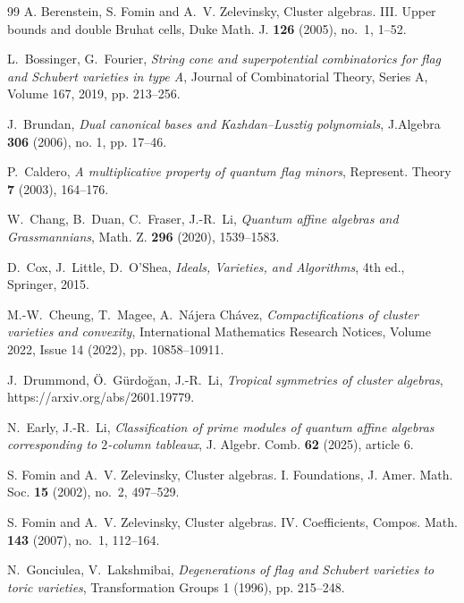 \documentclass[11pt]{amsart}
\numberwithin{equation}{section}
\begin{document}
\begin{thebibliography}{99}
 A. Berenstein, S. Fomin and A.~V. Zelevinsky, Cluster algebras. III. Upper bounds and double Bruhat cells, Duke Math. J. {\bf 126} (2005), no.~1, 1--52.

L.~Bossinger, G.~Fourier,
\emph{String cone and superpotential combinatorics for flag and Schubert varieties in type A}, 
Journal of Combinatorial Theory, Series A, Volume 167, 2019, pp. 213--256.

J.~Brundan, \emph{Dual canonical bases and Kazhdan–Lusztig polynomials}, 
J.Algebra {\bf 306} (2006), no. 1, pp. 17--46.

P.~Caldero, \emph{A multiplicative property of quantum flag minors}, Represent. Theory 
{\bf 7} (2003), 164--176.

W.~Chang, B.~Duan, C.~Fraser, J.-R.~Li,
\emph{Quantum affine algebras and Grassmannians}, Math. Z. {\bf 296} (2020), 1539--1583.

D.~Cox, J.~Little, D.~O'Shea,
\emph{Ideals, Varieties, and Algorithms},
4th ed., Springer, 2015.

M.-W.~Cheung, T.~Magee, A.~N\'ajera Ch\'avez, 
\emph{Compactifications of cluster varieties and convexity}, 
International Mathematics Research Notices, Volume 2022, Issue 14 (2022),  
pp. 10858--10911.


J.~Drummond, \"O.~G\"urdo\u{g}an, J.-R.~Li,
\emph{Tropical symmetries of cluster algebras}, https://arxiv.org/abs/2601.19779.


N.~Early,  J.-R.~Li, 
\emph{Classification of prime modules of quantum affine algebras corresponding to $2$-column tableaux}, J. Algebr. Comb. {\bf 62} (2025), article 6.


 S. Fomin and A.~V. Zelevinsky, Cluster algebras. I. Foundations, J. Amer. Math. Soc. {\bf 15} (2002), no.~2, 497--529.

 S. Fomin and A.~V. Zelevinsky, Cluster algebras. IV. Coefficients, Compos. Math. {\bf 143} (2007), no.~1, 112--164. 



N.~Gonciulea, V.~Lakshmibai, 
\emph{Degenerations of flag and Schubert varieties to toric varieties}, 
Transformation Groups 1 (1996), pp. 215--248.



\end{thebibliography}
\end{document}
